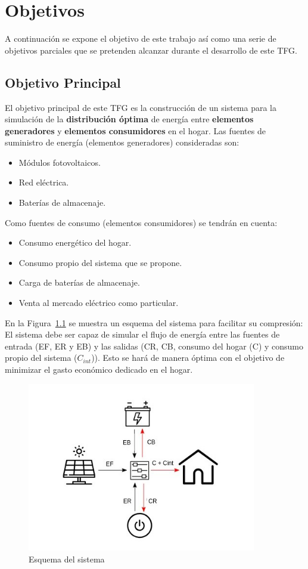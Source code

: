 \chapter{Objetivos}
\label{cap:Objetivo}
A continuación se expone el objetivo de este trabajo así como una serie de objetivos parciales que se pretenden alcanzar durante el desarrollo de este \gls{TFG}.
\section{Objetivo Principal}
El objetivo principal de este \gls{TFG} es la construcción de un sistema para la simulación de la \textbf{distribución óptima} de energía entre \textbf{elementos generadores} y \textbf{elementos consumidores} en el hogar. Las fuentes de suministro de energía (elementos generadores) consideradas son:
\begin{itemize}
	\item Módulos fotovoltaicos.
	\item Red eléctrica.
	\item Baterías de almacenaje.
\end{itemize}
Como fuentes de consumo (elementos consumidores) se tendrán en cuenta:
\begin{itemize}
	\item Consumo energético del hogar.
	\item Consumo propio del sistema que se propone.
	\item Carga de baterías de almacenaje.
	\item Venta al mercado eléctrico como particular.
\end{itemize}
En la Figura~\ref{fig:schema} se muestra un esquema del sistema para facilitar su compresión: El sistema debe ser capaz de simular el flujo de energía entre las fuentes de entrada (\gls{EF}, \gls{ER} y \gls{EB}) y las salidas (\gls{CR}, \gls{CB}, consumo del hogar (C) y consumo propio del sistema ($ C_{int} $)). Esto se hará de manera óptima con el objetivo de minimizar el gasto económico dedicado en el hogar.

\begin{figure}[H]
	\centering
	\includegraphics[width=10cm]{figs/System.jpg}
	\caption{Esquema del sistema}
        \label{fig:schema}
\end{figure}

